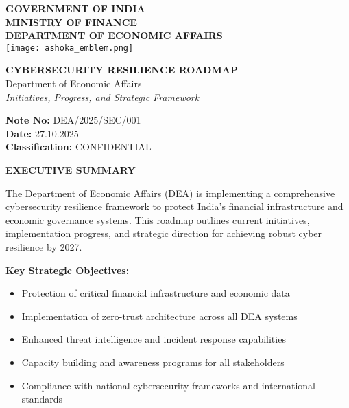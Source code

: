 \documentclass[12pt,a4paper]{report}
\newcommand{\sectionheader}[1]{\textbf{\color{govblue}#1}}
\begin{document}
\begin{center}
    {\Large \textbf{GOVERNMENT OF INDIA}}\\
    {\large \textbf{MINISTRY OF FINANCE}}\\
    {\large \textbf{DEPARTMENT OF ECONOMIC AFFAIRS}}\\[0.3cm]
    \texttt{[image: ashoka\_emblem.png]}\\[0.2cm]
\end{center}

\vspace{0.3cm}

\begin{center}
    {\Large \textbf{CYBERSECURITY RESILIENCE ROADMAP}}\\
    {\large Department of Economic Affairs}\\[0.2cm]
    {\large \textit{Initiatives, Progress, and Strategic Framework}}
\end{center}

\vspace{0.3cm}

\begin{flushright}
    \textbf{Note No:} DEA/2025/SEC/001\\
    \textbf{Date:} 27.10.2025\\
    \textbf{Classification:} \textcolor{secred}{CONFIDENTIAL}
\end{flushright}

\vspace{0.5cm}

\sectionheader{EXECUTIVE SUMMARY}

The Department of Economic Affairs (DEA) is implementing a comprehensive cybersecurity resilience framework to protect India's financial infrastructure and economic governance systems. This roadmap outlines current initiatives, implementation progress, and strategic direction for achieving robust cyber resilience by 2027.

\textbf{Key Strategic Objectives:}
\begin{itemize}[leftmargin=*, itemsep=3pt]
    \item Protection of critical financial infrastructure and economic data
    \item Implementation of zero-trust architecture across all DEA systems
    \item Enhanced threat intelligence and incident response capabilities
    \item Capacity building and awareness programs for all stakeholders
    \item Compliance with national cybersecurity frameworks and international standards
\end{itemize}
\end{document}
